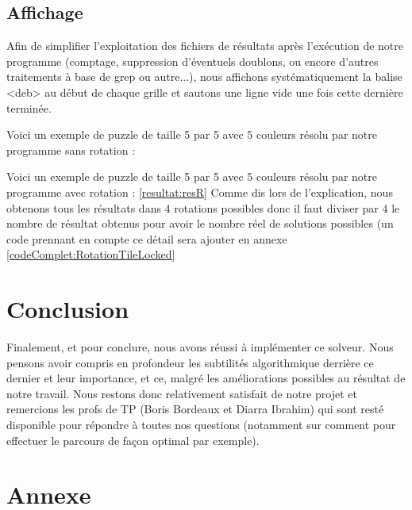\documentclass[french]{rapport}
\begin{document}
\subsection{Affichage}

Afin de simplifier l'exploitation des fichiers de résultats après l'exécution de notre programme (comptage, suppression d'éventuels doublons, ou encore d'autres traitements à base de grep ou autre...), nous affichons systématiquement la balise <deb> au début de chaque grille et sautons une ligne vide une fois cette dernière terminée.

Voici un exemple de puzzle de taille 5 par 5 avec 5 couleurs résolu
par notre programme sans rotation :


Voici un exemple de puzzle de taille 5 par 5 avec 5 couleurs résolu
par notre programme avec rotation :
\ref{resultat:resR}
Comme dis lors de l'explication, nous obtenons tous les résultats dans 4 rotations possibles donc il faut diviser par 4 le nombre de résultat obtenus pour avoir le nombre réel de solutions possibles (un code prennant en compte ce détail sera ajouter en annexe \ref{codeComplet:RotationTileLocked}


\section{Conclusion}

Finalement, et pour conclure, nous avons réussi à implémenter ce solveur. Nous pensons avoir compris en profondeur les subtilités algorithmique derrière ce dernier et leur importance, et ce, malgré les améliorations possibles au résultat de notre travail.
Nous restons donc relativement satisfait de notre projet et remercions les profs de TP (Boris Bordeaux et Diarra Ibrahim) qui sont resté disponible pour répondre à toutes nos questions (notamment sur comment pour effectuer le parcours de façon optimal par exemple).

\section{Annexe}








\end{document}
